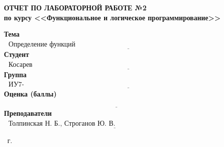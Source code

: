 \begin{titlepage}
	
	\begin{center}
		\Large\textbf{ОТЧЕТ ПО ЛАБОРАТОРНОЙ РАБОТЕ №2}\\
		\large\textbf{по курсу <<Функциональное и логическое программирование>>}\\
	\end{center}\vspace{2cm}

	
	\noindent\textbf{Тема} $\underline{\text{~~Определение функций пользователя.~~~~~~~~~~~~~~~~~~~~~~~~~~~~~~~~~~~~~~~~~~~~~~~~~~~~~~~~~~~~~}}$\newline\newline
	\noindent\textbf{Студент} $\underline{\text{~~Косарев А.А.~~~~~~~~~~~~~~~~~~~~~~~~~~~~~~~~~~~~~~~~~~~~~~~~~~~~~~~~~~~~~~~~~~~~~~~~~~~~~~~~~~~~~~~~~}}$\newline\newline
	\noindent\textbf{Группа} $\underline{\text{~~ИУ7-61Б~~~~~~~~~~~~~~~~~~~~~~~~~~~~~~~~~~~~~~~~~~~~~~~~~~~~~~~~~~~~~~~~~~~~~~~~~~~~~~~~~~~~~~~~~~~~~~~~~}}$\newline\newline
	\noindent\textbf{Оценка (баллы)} $\underline{\text{~~~~~~~~~~~~~~~~~~~~~~~~~~~~~~~~~~~~~~~~~~~~~~~~~~~~~~~~~~~~~~~~~~~~~~~~~~~~~~~~~~~~~~~~~~~~~~~~~~}}$\newline\newline
	\noindent\textbf{Преподаватели} $\underline{\text{~~Толпинская Н. Б., Строганов Ю. В.~~~~~~~~~~~~~~~~~~~~~~~~~~~~~~~~~~~~~~~~~~~~~~~~}}$\newline
	
	\begin{center}
		\vfill
		\the\year
		~г.
	\end{center}
\end{titlepage}

